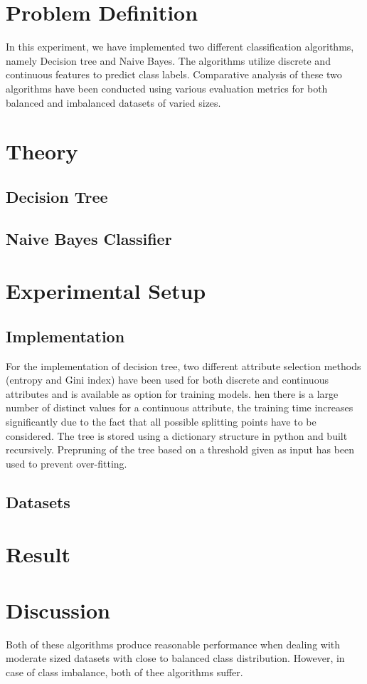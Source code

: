 \documentclass[12pt]{article}
\begin{document}
\maketitle
\thispagestyle{empty}
\clearpage
\newpage

\section{Problem Definition}
In this experiment, we have implemented two different classification algorithms, namely Decision tree and Naive Bayes. The algorithms utilize discrete and continuous features to predict class labels. Comparative analysis of these two algorithms have been conducted using various evaluation metrics for both balanced and imbalanced datasets of varied sizes.




\section{Theory}
\subsection{Decision Tree}

\subsection{Naive Bayes Classifier}


\section{Experimental Setup}
\subsection{Implementation}
For the implementation of decision tree, two different attribute selection methods (entropy and Gini index) have been used for both discrete and continuous attributes and is available as option for training models. hen there is a large number of distinct values for a continuous attribute, the training time increases significantly due to the fact that all possible splitting points have to be considered. The tree is stored using a dictionary structure in python and built recursively. Prepruning of the tree based on a threshold given as input has been used to prevent over-fitting.

\subsection{Datasets}



\section{Result}


\section{Discussion}
  Both of these algorithms produce reasonable performance when dealing with moderate sized datasets with close to balanced class distribution. However, in case of class imbalance, both of thee algorithms suffer.
\end{document}
